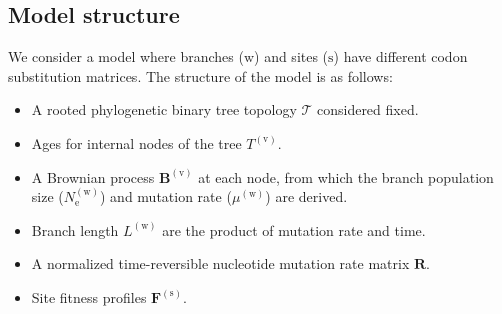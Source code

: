 \documentclass{article}
\newcommand{\e}{\mathrm{e}}
\newcommand{\Ne}{N_\e}
\newcommand{\mutmatrix}{R}
\newcommand{\Mutmatrix}{\bm{\mutmatrix}}
\newcommand{\scaledfit}{F}
\newcommand{\ScaledFit}{\bm{\scaledfit}}
\newcommand{\Tree}{\mathcal{T}}
\newcommand{\branch}{\text{w}}
\newcommand{\branchexp}{^{(\branch)}}
\newcommand{\node}{\text{v}}
\newcommand{\site}{\text{s}}
\newcommand{\siteexp}{^{(\site)}}
\newcommand{\brownian}{\bm{B}}
\begin{document}
\subsection{Model structure}
We consider a model where branches ($\branch$) and sites ($\site$) have different codon substitution matrices. The structure of the model is as follows:
\begin{itemize}
	\setlength\itemsep{-0.25em}
	\item A rooted phylogenetic binary tree topology $\Tree$ considered fixed.
	\item Ages for internal nodes of the tree $T^{(\node)}$.
	\item A Brownian process $\brownian^{(\node)}$ at each node, from which the branch population size ($\Ne\branchexp$) and mutation rate ($\mu\branchexp$) are derived.
	\item Branch length $L\branchexp$ are the product of mutation rate and time.
	\item A normalized time-reversible nucleotide mutation rate matrix $\Mutmatrix$.
	\item Site fitness profiles $\ScaledFit\siteexp$.
\end{itemize}
\end{document}
